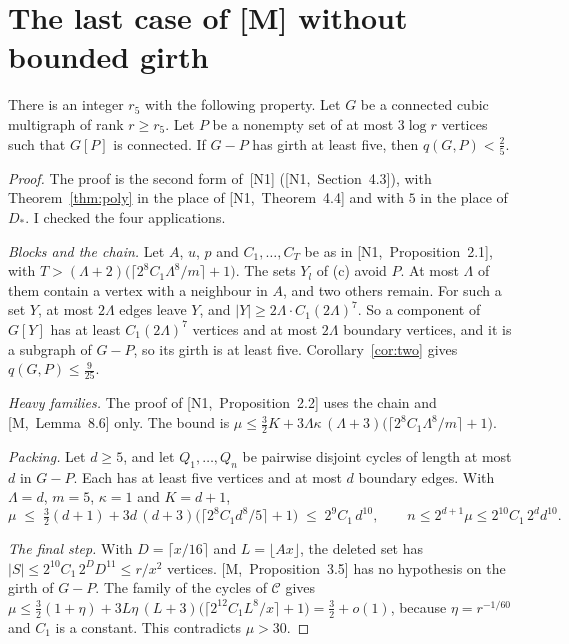 \documentclass[11pt]{article}
\newcommand{\M}[1]{[M,~#1]}
\newcommand{\N}[1]{[N1,~#1]}
\begin{document}
\section{The last case of [M] without bounded girth}\label{sec:last}

\begin{theorem}[{\M{Theorem~8.1} for girth five}]\label{thm:half}
There is an integer $r_5$ with the following property. Let $G$ be a connected cubic multigraph of
rank $r\ge r_5$. Let $P$ be a nonempty set of at most $3\log r$ vertices such that $G[P]$ is
connected. If $G-P$ has girth at least five, then $q(G,P)<\frac25$.
\end{theorem}

\begin{proof}
The proof is the second form of~[N1] (\N{Section~4.3}), with Theorem~\ref{thm:poly} in the
place of \N{Theorem~4.4} and with $5$ in the place of $D_*$. I checked the four applications.

\emph{Blocks and the chain.} Let $A$, $u$, $p$ and $C_1,\dots,C_T$ be as in \N{Proposition~2.1},
with $T>(\Lambda+2)\bigl(\lceil2^{8}C_1\Lambda^{8}/m\rceil+1\bigr)$. The sets $Y_l$ of (c) avoid
$P$. At most $\Lambda$ of them contain a vertex with a neighbour in $A$, and two others remain.
For such a set $Y$, at most $2\Lambda$ edges leave $Y$, and
$|Y|\ge2\Lambda\cdot C_1(2\Lambda)^{7}$. So a component of $G[Y]$ has at least
$C_1(2\Lambda)^{7}$ vertices and at most $2\Lambda$ boundary vertices, and it is a subgraph of
$G-P$, so its girth is at least five. Corollary~\ref{cor:two} gives $q(G,P)\le\frac9{25}$.

\emph{Heavy families.} The proof of \N{Proposition~2.2} uses the chain and \M{Lemma~8.6} only.
The bound is
$\mu\le\frac32K+3\Lambda\kappa\,(\Lambda+3)\bigl(\lceil2^{8}C_1\Lambda^{8}/m\rceil+1\bigr)$.

\emph{Packing.} Let $d\ge5$, and let $Q_1,\dots,Q_n$ be pairwise disjoint cycles of length at
most $d$ in $G-P$. Each has at least five vertices and at most $d$ boundary edges. With
$\Lambda=d$, $m=5$, $\kappa=1$ and $K=d+1$,
\[
  \mu\;\le\;\tfrac32(d+1)+3d\,(d+3)\bigl(\lceil2^{8}C_1d^{8}/5\rceil+1\bigr)\;\le\;2^{9}C_1\,d^{10},
  \qquad n\le2^{d+1}\mu\le2^{10}C_1\,2^{d}d^{10} .
\]

\emph{The final step.} With $D=\lceil x/16\rceil$ and $L=\lfloor Ax\rfloor$, the deleted set has
$|S|\le2^{10}C_1\,2^{D}D^{11}\le r/x^{2}$ vertices. \M{Proposition~3.5} has no hypothesis on the
girth of $G-P$. The family of the cycles of $\mathcal C$ gives
$\mu\le\frac32(1+\eta)+3L\eta\,(L+3)\bigl(\lceil2^{12}C_1L^{8}/x\rceil+1\bigr)=\frac32+o(1)$,
because $\eta=r^{-1/60}$ and $C_1$ is a constant. This contradicts $\mu>30$.
\end{proof}
\end{document}
